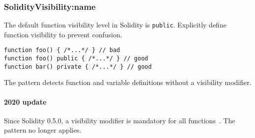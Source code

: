 \subsubsection{\usevalue SolidityVisibility:name } \label{SolidityVisibility}

The default function visibility level in Solidity is \texttt{public}.
Explicitly define function visibility to prevent confusion.
\begin{lstlisting}[language=Solidity]
function foo() { /*...*/ } // bad
function foo() public { /*...*/ } // good
function bar() private { /*...*/ } // good
\end{lstlisting}

The pattern detects function and variable definitions without a visibility modifier.

\paragraph{2020 update}
Since Solidity 0.5.0, a visibility modifier is mandatory for all functions~\cite{Solidity050}.
The pattern no longer applies.


